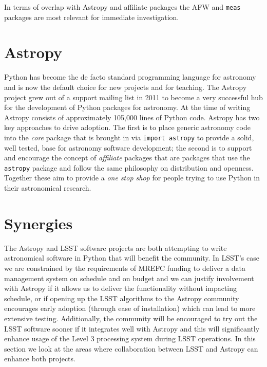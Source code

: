 \documentclass[]{spie}  %
\begin{document}
In terms of overlap with Astropy and affiliate packages the AFW and \texttt{meas} packages are most relevant for immediate investigation.


\section{Astropy}

Python has become the de facto standard programming language for astronomy\cite{2000ASPC..216...59G,2006ASPC..351..343H,2006ASPC..351..497K,2011ASPC..442..425G,2012SPIE.8451E..02J} and is now the default choice for new projects and for teaching.
The Astropy\cite{2013A&A...558A..33A} project grew out of a support mailing list in 2011 to become a very successful hub for the development of Python packages for astronomy.
At the time of writing Astropy consists of approximately 105,000 lines of Python code.
Astropy has two key approaches to drive adoption.
The first is to place generic astronomy code into the \emph{core} package that is brought in via \texttt{import astropy} to provide a solid, well tested, base for astronomy software development; the second is to support and encourage the concept of \emph{affiliate} packages that are packages that use the \texttt{astropy} package and follow the same philosophy on distribution and openness.
Together these aim to provide a \emph{one stop shop} for people trying to use Python in their astronomical research.

\section{Synergies}

The Astropy and LSST software projects are both attempting to write astronomical software in Python that will benefit the community.
In LSST's case we are constrained by the requirements of MREFC funding to deliver a data management system on schedule and on budget and we can justify involvement with Astropy if it allows us to deliver the functionality without impacting schedule, or if opening up the LSST algorithms to the Astropy community encourages early adoption (through ease of installation) which can lead to more extensive testing.
Additionally, the community will be encouraged to try out the LSST software sooner if it integrates well with Astropy and this will significantly enhance usage of the Level 3 processing system during LSST operations.
In this section we look at the areas where collaboration between LSST and Astropy can enhance both projects.
\end{document}
